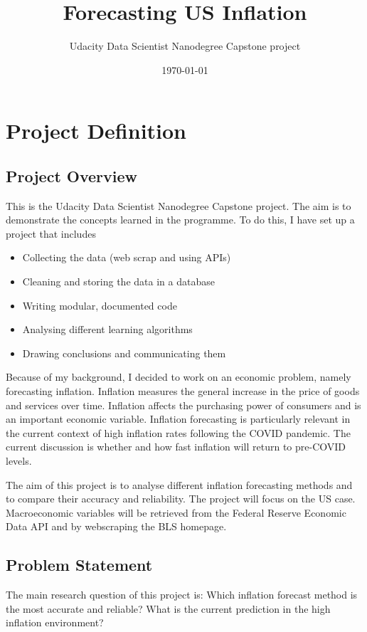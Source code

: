 \documentclass[12pt]{article}
\title{Forecasting US Inflation}
\author{Udacity Data Scientist Nanodegree Capstone project}
\date{\today}
\begin{document}
\maketitle
\tableofcontents
\newpage

\section{Project Definition}
\subsection{Project Overview}

This is the Udacity Data Scientist Nanodegree Capstone project. The aim is to demonstrate the concepts learned in the programme. To do this, I have set up a project that includes
\begin{itemize}
\item Collecting the data (web scrap and using APIs)
\item Cleaning and storing the data in a database
\item Writing modular, documented code 
\item Analysing different learning algorithms
\item Drawing conclusions and communicating them
\end{itemize}

Because of my background, I decided to work on an economic problem, namely forecasting inflation. Inflation measures the general increase in the price of goods and services over time. Inflation affects the purchasing power of consumers and is an important economic variable. Inflation forecasting is particularly relevant in the current context of high inflation rates following the COVID pandemic.  The current discussion is whether and how fast inflation will return to pre-COVID levels. 

The aim of this project is to analyse different inflation forecasting methods and to compare their accuracy and reliability. The project will focus on the US case. Macroeconomic variables will be retrieved from the Federal Reserve Economic Data API and by webscraping the BLS homepage.


\subsection{Problem Statement}


The main research question of this project is: Which inflation forecast method is the most accurate and reliable? What is the current prediction in the high inflation environment?
\end{document}
